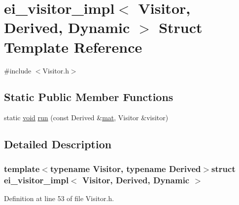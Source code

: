 \hypertarget{structei__visitor__impl_3_01_visitor_00_01_derived_00_01_dynamic_01_4}{\section{ei\-\_\-visitor\-\_\-impl$<$ Visitor, Derived, Dynamic $>$ Struct Template Reference}
\label{structei__visitor__impl_3_01_visitor_00_01_derived_00_01_dynamic_01_4}
}


{\ttfamily \#include $<$Visitor.\-h$>$}

\subsection*{Static Public Member Functions}
\begin{DoxyCompactItemize}
\item 
static \hyperlink{group___u_a_v_objects_plugin_ga444cf2ff3f0ecbe028adce838d373f5c}{void} \hyperlink{structei__visitor__impl_3_01_visitor_00_01_derived_00_01_dynamic_01_4_a4e7962d654a06b589ea6504b597c958d}{run} (const Derived \&\hyperlink{uavobjecttemplate_8m_a16a51e808b16c46bbfd36da2e37cd123}{mat}, Visitor \&visitor)
\end{DoxyCompactItemize}


\subsection{Detailed Description}
\subsubsection*{template$<$typename Visitor, typename Derived$>$struct ei\-\_\-visitor\-\_\-impl$<$ Visitor, Derived, Dynamic $>$}



Definition at line 53 of file Visitor.\-h.



